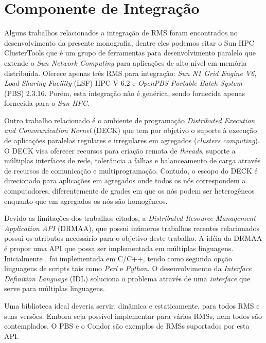 \chapter{Componente de Integração}
\label{cap:drmaa}

Alguns trabalhos relacionados a integração de RMS foram encontrados no desenvolvimento da presente monografia, dentre eles podemos citar o Sun HPC ClusterTools \cite{sunhpc} que é um grupo de ferramentas para desenvolvimento paralelo que extende o \emph{Sun Network Computing} para aplicações de alto nível em memória distribuída. Oferece apenas três RMS para integração: \emph{Sun N1 Grid Engine V6}, \emph{Load Sharing Facility} (LSF) HPC V 6.2 e \emph{OpenPBS Portable Batch System} (PBS) 2.3.16. Porém, esta integração não é genérica, sendo fornecida apenas fornecida para o \emph{Sun HPC}.

Outro trabalho relacionado é o ambiente de programação \emph{Distributed Execution and Communication Kernel} (DECK) \cite{Barreto2000} que tem por objetivo o suporte à execução de aplicações paralelas regulares e irregulares em agregados (\emph{clusters computing}). O DECK visa oferecer recursos para criação remota de \emph{threads}, suporte a múltiplas interfaces de rede, tolerância a falhas e balanceamento de carga através de recursos de comunicação e multiprogramação. Contudo, o escopo do DECK é direcionado para aplicações em agregados onde todos os nós correspondem a computadores, diferentemente de grades em que os nós podem ser heterogêneos enquanto que em agregados os nós são homogêneos. 

Devido as limitações dos trabalhos citados, a \emph{Distributed Resource Management Application API} (DRMAA), que possui inúmeros trabalhos recentes relacionados \cite{Ciesnik2007, Haas2004, Herrera2007, Templeton2006}  possui os atributos necessário para o objetivo deste trabalho. A idéia da DRMAA é propor uma API que possa ser implementada em múltiplas linguagens. Inicialmente , foi  implementada em C/C++, tendo como segunda opção linguagens de scripts tais como \emph{Perl} e \emph{Python}. O desenvolvimento da \emph{Interface Definition Language} (IDL) soluciona o problema através de uma \emph{interface} que serve para múltiplas linguagens.

Uma biblioteca ideal deveria servir, dinâmica e estaticamente, para todos RMS e suas versões. Embora seja possível implementar para vários RMSs, nem todos são contemplados. O PBS e o Condor são exemplos de RMSs suportados por esta API.


